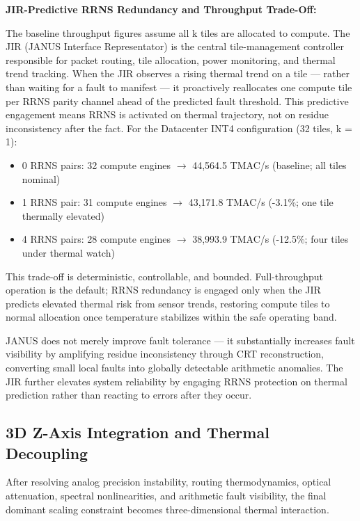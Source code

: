 \documentclass[journal]{IEEEtran}
\begin{document}
\begin{center}
\textbf{JIR-Predictive RRNS Redundancy and Throughput Trade-Off: } 
\end{center}

The baseline throughput figures assume all k tiles are allocated to compute. The JIR (JANUS Interface Representator) is the central tile-management controller responsible for packet routing, tile allocation, power monitoring, and thermal trend tracking. When the JIR observes a rising thermal trend on a tile --- rather than waiting for a fault to manifest --- it proactively reallocates one compute tile per RRNS parity channel ahead of the predicted fault threshold. This predictive engagement means RRNS is activated on thermal trajectory, not on residue inconsistency after the fact. For the Datacenter INT4 configuration (32 tiles, k = 1):

\begin{itemize}
\item  0 RRNS pairs: 32 compute engines $\rightarrow$ 44,564.5 TMAC/s
(baseline; all tiles nominal)
\item  1 RRNS pair: 31 compute engines $\rightarrow$ 43,171.8 TMAC/s
(-3.1\%; one tile thermally elevated)
\item  4 RRNS pairs: 28 compute engines $\rightarrow$ 38,993.9 TMAC/s
(-12.5\%; four tiles under thermal watch)
\end{itemize}

This trade-off is deterministic, controllable, and bounded. Full-throughput operation is the default; RRNS redundancy is engaged only when the JIR predicts elevated thermal risk from sensor trends, restoring compute tiles to normal allocation once temperature stabilizes within the safe operating band.

JANUS does not merely improve fault tolerance --- it substantially increases fault visibility by amplifying residue inconsistency through CRT reconstruction, converting small local faults into globally detectable arithmetic anomalies. The JIR further elevates system reliability by engaging RRNS protection on thermal prediction rather than reacting to errors after they occur.

\subsection{\textbf{3D Z-Axis Integration and Thermal Decoupling}}
\label{sec:zaxis_thermal}

After resolving analog precision instability, routing thermodynamics, optical attenuation, spectral nonlinearities, and arithmetic fault visibility, the final dominant scaling constraint becomes three-dimensional thermal interaction.
\end{document}
